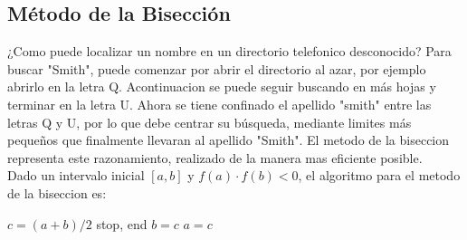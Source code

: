 \subsection{Método de la Bisección}
\vspace{0.5cm}
\raggedright

¿Como puede localizar un nombre en un directorio telefonico desconocido? Para 
buscar "Smith", puede comenzar por abrir el directorio al azar, por ejemplo 
abrirlo en la letra Q. Acontinuacion se puede seguir buscando en más hojas y terminar en la letra 
U. Ahora se tiene confinado el apellido "smith" entre las letras Q y U, por lo que debe centrar su 
búsqueda, mediante limites más pequeños que finalmente llevaran al apellido "Smith". El metodo de 
la biseccion representa este razonamiento, realizado de la manera mas eficiente posible.\\
\vspace{0.2cm}
Dado un intervalo inicial \([a, b]\) y \(f(a) \cdot f(b) < 0\), el algoritmo para el metodo de la biseccion es:\\

\begin{algorithm}
\begin{algorithmic}[1]
    \STATE $c = (a + b)/2$
    \STATE stop, end
  \ENDIF
    \STATE $b = c$
  \ELSE
    \STATE $a = c$
  \ENDIF
  \ENDWHILE
\end{algorithmic}
\end{algorithm}

